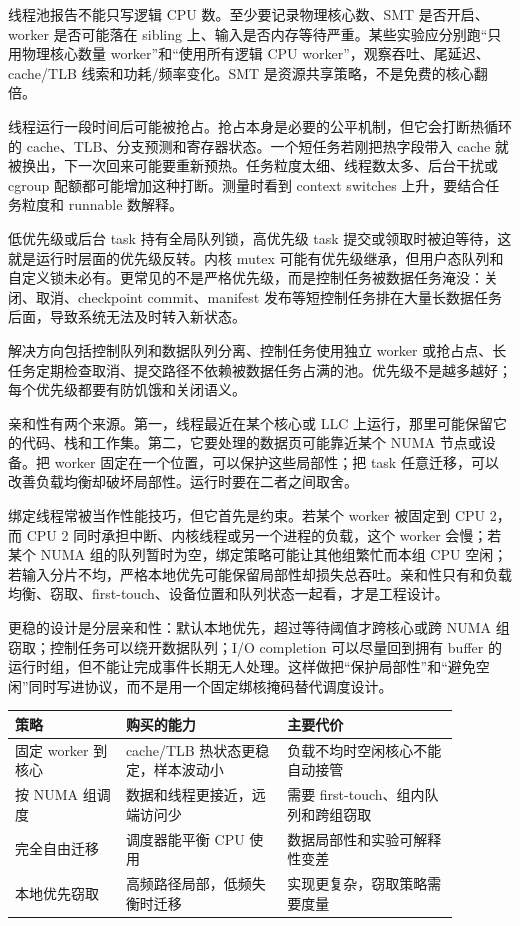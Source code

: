 线程池报告不能只写逻辑 CPU 数。至少要记录物理核心数、SMT 是否开启、worker 是否可能落在 sibling 上、输入是否内存等待严重。某些实验应分别跑“只用物理核心数量 worker”和“使用所有逻辑 CPU worker”，观察吞吐、尾延迟、cache/TLB 线索和功耗/频率变化。SMT 是资源共享策略，不是免费的核心翻倍。

线程运行一段时间后可能被抢占。抢占本身是必要的公平机制，但它会打断热循环的 cache、TLB、分支预测和寄存器状态。一个短任务若刚把热字段带入 cache 就被换出，下一次回来可能要重新预热。任务粒度太细、线程数太多、后台干扰或 cgroup 配额都可能增加这种打断。测量时看到 context switches 上升，要结合任务粒度和 runnable 数解释。

低优先级或后台 task 持有全局队列锁，高优先级 task 提交或领取时被迫等待，这就是运行时层面的优先级反转。内核 mutex 可能有优先级继承，但用户态队列和自定义锁未必有。更常见的不是严格优先级，而是控制任务被数据任务淹没：关闭、取消、checkpoint commit、manifest 发布等短控制任务排在大量长数据任务后面，导致系统无法及时转入新状态。

解决方向包括控制队列和数据队列分离、控制任务使用独立 worker 或抢占点、长任务定期检查取消、提交路径不依赖被数据任务占满的池。优先级不是越多越好；每个优先级都要有防饥饿和关闭语义。

亲和性有两个来源。第一，线程最近在某个核心或 LLC 上运行，那里可能保留它的代码、栈和工作集。第二，它要处理的数据页可能靠近某个 NUMA 节点或设备。把 worker 固定在一个位置，可以保护这些局部性；把 task 任意迁移，可以改善负载均衡却破坏局部性。运行时要在二者之间取舍。

绑定线程常被当作性能技巧，但它首先是约束。若某个 worker 被固定到 CPU 2，而 CPU 2 同时承担中断、内核线程或另一个进程的负载，这个 worker 会慢；若某个 NUMA 组的队列暂时为空，绑定策略可能让其他组繁忙而本组 CPU 空闲；若输入分片不均，严格本地优先可能保留局部性却损失总吞吐。亲和性只有和负载均衡、窃取、first-touch、设备位置和队列状态一起看，才是工程设计。

更稳的设计是分层亲和性：默认本地优先，超过等待阈值才跨核心或跨 NUMA 组窃取；控制任务可以绕开数据队列；I/O completion 可以尽量回到拥有 buffer 的运行时组，但不能让完成事件长期无人处理。这样做把“保护局部性”和“避免空闲”同时写进协议，而不是用一个固定绑核掩码替代调度设计。

\begin{center}
\begin{tabular}{p{0.22\linewidth}p{0.32\linewidth}p{0.34\linewidth}}
\toprule
策略 & 购买的能力 & 主要代价 \\
\midrule
固定 worker 到核心 & cache/TLB 热状态更稳定，样本波动小 & 负载不均时空闲核心不能自动接管 \\
按 NUMA 组调度 & 数据和线程更接近，远端访问少 & 需要 first-touch、组内队列和跨组窃取 \\
完全自由迁移 & 调度器能平衡 CPU 使用 & 数据局部性和实验可解释性变差 \\
本地优先窃取 & 高频路径局部，低频失衡时迁移 & 实现更复杂，窃取策略需要度量 \\
\bottomrule
\end{tabular}
\end{center}

